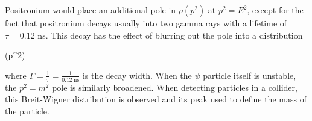 Positronium would place an additional pole in $\rho(p^2)$ at $p^2 = E^2$, except for the fact that positronium decays usually into two gamma rays with a lifetime of $\tau = 0.12$ ns. This decay has the effect of blurring out the pole into a  distribution 
\begin{e}
  \rho(p^2) \propto {}
\end{e}
where $\Gamma = \frac{1}{\tau} = \frac{1}{\SI{0.12}{\nano\second}}$ is the decay width. When the $\psi$ particle itself is unstable, the $p^2=m^2$ pole is similarly broadened. When detecting particles in a collider, this Breit-Wigner distribution is observed and its peak used to define the mass of the particle.


